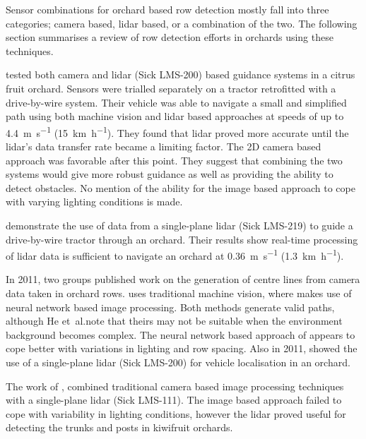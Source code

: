 \documentclass[preprint,authoryear,12pt]{elsarticle}
\begin{document}
        Sensor combinations for orchard based row detection mostly fall into three categories; camera based, lidar based, or a combination of the two.
        The following section summarises a review of row detection efforts in orchards using these techniques.

        \cite{Subramanian2006} tested both camera and lidar (Sick LMS-200) based guidance systems in a citrus fruit orchard.
        Sensors were trialled separately on a tractor retrofitted with a drive-by-wire system.
        Their vehicle was able to navigate a small and simplified path using both machine vision and lidar based approaches at speeds of up to \SI{4.4}{\meter\per\second} (\SI{15}{\kilo\meter\per\hour}).
        They found that lidar proved more accurate until the lidar's data transfer rate became a limiting factor.
        The 2D camera based approach was favorable after this point.
        They suggest that combining the two systems would give more robust guidance as well as providing the ability to detect obstacles.
        No mention of the ability for the image based approach to cope with varying lighting conditions is made.

        \cite{Barawid2007} demonstrate the use of data from a single-plane lidar (Sick LMS-219) to guide a drive-by-wire tractor through an orchard.
        Their results show real-time processing of lidar data is sufficient to navigate an orchard at \SI{0.36}{\meter\per\second} (\SI{1.3}{\kilo\meter\per\hour}).


        In 2011, two groups published work on the generation of centre lines from camera data taken in orchard rows.
        \cite{He2011} uses traditional machine vision, where \cite{Torres2011} makes use of neural network based image processing.
        Both methods generate valid paths, although He et~al.\@ note that theirs may not be suitable when the environment background becomes complex.
        The neural network based approach of \cite{Torres2011} appears to cope better with variations in lighting and row spacing.
        Also in 2011, \cite{Hansen2011} showed the use of a single-plane lidar (Sick LMS-200) for vehicle localisation in an orchard.

        The work of \cite{Scarfe2012}, combined traditional camera based image processing techniques with a single-plane lidar (Sick LMS-111).
        The image based approach failed to cope with variability in lighting conditions, however the lidar proved useful for detecting the trunks and posts in kiwifruit orchards.
\end{document}
